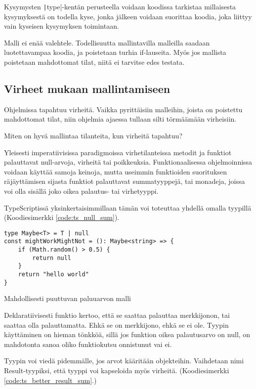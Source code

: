 Kysymysten \texttt|type|-kentän perusteella voidaan koodissa tarkistaa millaisesta kysymyksestä on todella kyse, jonka jälkeen voidaan suorittaa koodia, joka liittyy vain kyseisen kysymyksen toimintaan.

Malli ei enää valehtele. Todellisuutta mallintavilla malleilla saadaan luotettavampaa koodia, ja poistetaan turhia if-lauseita. Myös jos mallista poistetaan mahdottomat tilat, niitä ei tarvitse edes testata.

\subsection{Virheet mukaan mallintamiseen}

Ohjelmissa tapahtuu virheitä. Vaikka pyrittäisiin malleihin, joista on poistettu mahdottomat tilat, niin ohjelmia ajaessa tullaan silti törmäämään virheisiin.

Miten on hyvä mallintaa tilanteita, kun virheitä tapahtuu?

Yleisesti imperatiivisissa paradigmoissa virhetilanteissa metodit ja funktiot palauttavat null-arvoja, virheitä tai poikkeuksia.
Funktionaalisessa ohjelmoinnissa voidaan käyttää samoja keinoja, mutta useimmin funktioiden suorituksen räjäyttämisen sijasta funktiot palauttavat summatyyppejä, tai monadeja, joissa voi olla sisällä joko oikea palautus- tai virhetyyppi.

TypeScriptissä yksinkertaisimmillaan tämän voi toteuttaa yhdellä omalla tyypillä (Koodiesimerkki \ref{code:ts_null_sum}).

\begin{code}
    \begin{verbatim}
type Maybe<T> = T | null
const mightWorkMightNot = (): Maybe<string> => {
    if (Math.random() > 0.5) {
        return null
    }
    return "hello world"
}
    \end{verbatim}
    \caption{Mahdollisesti puuttuvan paluuarvon malli}
    \label{code:ts_null_sum}
\end{code}

Deklaratiivisesti funktio kertoo, että se saattaa palauttaa merkkijonon, tai saattaa olla palauttamatta. Ehkä se on merkkijono, ehkä se ei ole.
Tyypin käyttäminen on hieman tönkköä, sillä jos funktion oikea palautusarvo on null, on mahdotonta sanoa oliko funktiokutsu onnistunut vai ei.

Tyypin voi viedä pidemmälle, jos arvot kääritään objekteihin. Vaihdetaan nimi Result-tyypiksi, että tyyppi voi kapseloida myös virheitä. (Koodiesimerkki \ref{code:ts_better_result_sum}.)

